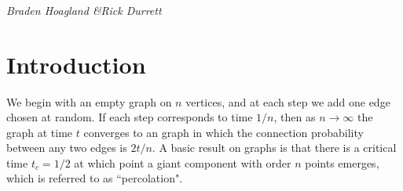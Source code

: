 \documentclass[twoside,10pt]{article}
\begin{document}

\thispagestyle{empty}
\begin{center}
	\MakeUppercase{
		{\large{} \\ }\\
		\vspace{10mm}
		{\footnotesize {}}\\
		\vspace{5mm}
	}
	{\footnotesize\textit{Braden Hoagland \quad\&\quad Rick Durrett}}
\end{center}


\begin{abstract}
	We develop the theory of cluster growth near criticality for a class of ``two-choice rules" for dynamically grown graphs. We use scaling theory to compute critical exponents for any two-choice rule, and we show special cases in which we can solve for these exponents explicitly. Finally, we compare our results with the corresponding results for the \ER rule, the simplest two-choice rule for which more explicit calculations are possible. We derive several of its important properties, then show that a large subset of two-choice rules - bounded size rules - behave like \ER near criticality.
\end{abstract}

\section{Introduction}


We begin with an empty graph on $n$ vertices, and at each step we add one edge chosen at random. If each step corresponds to time $1/n$, then as $n\to \infty$ the graph at time $t$ converges to an \ER graph in which the connection probability between any two edges is $2t/n$. A basic result on \ER graphs \cite{ER} is that there is a critical time $t_{c}=1/2$ at which point a giant component with order $n$ points emerges, which is referred to as ``percolation".
\end{document}
